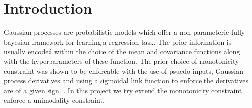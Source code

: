 \section{Introduction}
Gaussian processes are probabilistic models which offer a non parameteric fully bayesian framework for learning a regression task. The prior information is usually encoded within the choice of the mean and covariance functions along with the hyperparameters of these function. The prior choice of monotonicity constraint was shown to be enforcable with the use of psuedo inputs, Gaussian process derivatives and using a sigmoidal link function to enforce the derivatives are of a given sign. \cite{JaaAki10}. In this project we try extend the monotonicity constraint enforce a unimodality constraint.